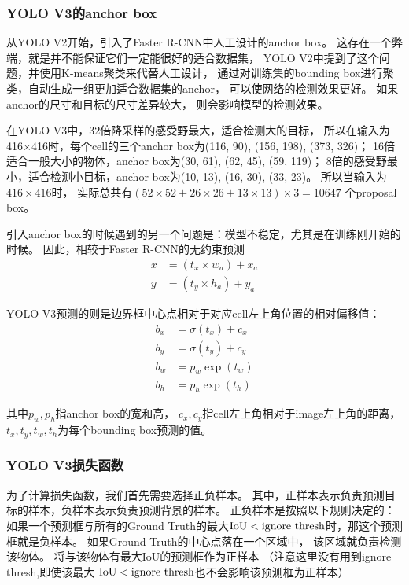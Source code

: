 \documentclass[UTF8]{ctexart}
\begin{document}
\subsubsection{YOLO V3的anchor box}
从YOLO V2开始，引入了Faster R-CNN中人工设计的anchor box。
这存在一个弊端，就是并不能保证它们一定能很好的适合数据集，
YOLO V2中提到了这个问题，并使用K-means聚类来代替人工设计，
通过对训练集的bounding box进行聚类，自动生成一组更加适合数据集的anchor，
可以使网络的检测效果更好。
如果anchor的尺寸和目标的尺寸差异较大，
则会影响模型的检测效果。

在YOLO V3中，32倍降采样的感受野最大，适合检测大的目标，
所以在输入为416×416时，每个cell的三个anchor box为(116, 90), (156, 198), (373, 326)；
16倍适合一般大小的物体，anchor box为(30, 61), (62, 45), (59, 119)；
8倍的感受野最小，适合检测小目标，anchor box为(10, 13), (16, 30), (33, 23)。
所以当输入为$416\times416$时，
实际总共有$(52\times52+26\times26+13\times13)\times3=10647$
个proposal box。

引入anchor box的时候遇到的另一个问题是：模型不稳定，尤其是在训练刚开始的时候。
因此，相较于Faster R-CNN的无约束预测
$$\begin{aligned}
    x &= (t_x \times w_a) + x_a \\
    y &= (t_y \times h_a) + y_a
\end{aligned}$$

YOLO V3预测的则是边界框中心点相对于对应cell左上角位置的相对偏移值：
$$\begin{aligned}
    b_x &= \sigma(t_x) + c_x \\
    b_y &= \sigma(t_y) + c_y \\
    b_w &= p_w \exp(t_w) \\
    b_h &= p_h \exp(t_h)
\end{aligned}$$

其中$p_w,p_h$指anchor box的宽和高，
$c_x,c_y$指cell左上角相对于image左上角的距离，
$t_x,t_y,t_w,t_h$为每个bounding box预测的值。

\subsubsection{YOLO V3损失函数}
为了计算损失函数，我们首先需要选择正负样本。
其中，正样本表示负责预测目标的样本，负样本表示负责预测背景的样本。
正负样本是按照以下规则决定的：
如果一个预测框与所有的Ground Truth的最大${\rm IoU}<{\rm ignore\ thresh}$时，那这个预测框就是负样本。
如果Ground Truth的中心点落在一个区域中，
该区域就负责检测该物体。
将与该物体有最大IoU的预测框作为正样本
（注意这里没有用到ignore thresh,即使该最大
${\rm IoU}<{\rm ignore\ thresh}$也不会影响该预测框为正样本）
\end{document}
